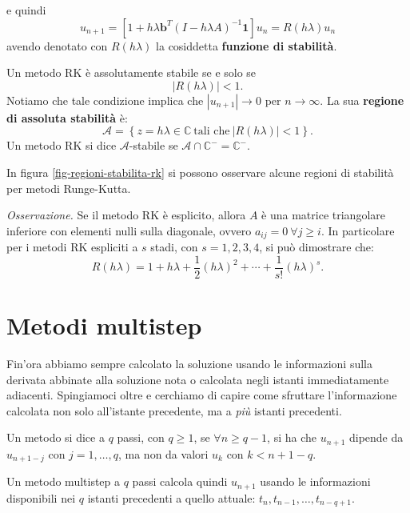e quindi
\begin{equation*}
u_{n+1} =\left[ 1+h\lambda \mathbf{b}^{T}( I-h\lambda A)^{-1}\mathbf{1}\right] u_{n} =R( h\lambda ) u_{n}
\end{equation*}
avendo denotato con $R( h\lambda )$ la cosiddetta \textbf{funzione di stabilità}.
\begin{definition}
Un metodo RK è assolutamente stabile se e solo se
$$| R( h\lambda )| < 1.$$
Notiamo che tale condizione implica che $|u_{n+1} |\to 0$ per $n\to\infty$. La sua \textbf{regione di assoluta stabilità} è:
$$\mathcal{A} =\left\{z=h\lambda \in \mathbb{C} \ \text{tali che} \ | R( h\lambda )| < 1\right\}.$$
Un metodo RK si dice $\mathcal{A}$-stabile se $\mathcal A\cap \mathbb{C}^{-} =\mathbb{C}^{-}$.
\end{definition}
In figura \ref{fig-regioni-stabilita-rk} si possono osservare alcune regioni di stabilità per metodi Runge-Kutta.

\textit{Osservazione.}
Se il metodo RK è esplicito, allora $A$ è una matrice triangolare inferiore con elementi nulli sulla diagonale, ovvero $a_{ij} =0 \ \forall j\geqslant i$. In particolare per i metodi RK espliciti a $s$ stadi, con $s=1,2,3,4$, si può dimostrare che:
\begin{equation*}
R( h\lambda ) =1+h\lambda +\frac{1}{2}( h\lambda )^{2} +\cdots +\frac{1}{s!}( h\lambda )^{s}.
\end{equation*}


\section{Metodi multistep}
\label{sec:metodi-multistep}
Fin'ora abbiamo sempre calcolato la soluzione usando le informazioni sulla derivata abbinate alla soluzione nota o calcolata negli istanti immediatamente adiacenti. Spingiamoci oltre e cerchiamo di capire come sfruttare l'informazione calcolata non solo all'istante precedente, ma a \textit{più} istanti precedenti.
\begin{definition}
Un metodo si dice a $q$ passi, con $q\geqslant 1$, se $\forall n\geqslant q-1$, si ha che $u_{n+1}$ dipende da $u_{n+1-j}$ con $j=1,\ldots,q$, ma non da valori $u_{k}$ con $k< n+1-q$.
\end{definition}
Un metodo multistep a $q$ passi calcola quindi $u_{n+1}$ usando le informazioni disponibili nei $q$ istanti precedenti a quello attuale: $t_{n} ,t_{n-1} ,\dotsc, t_{n-q+1}$.


